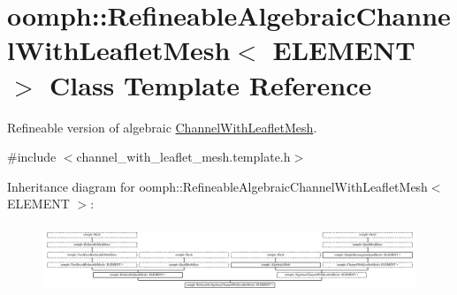 \hypertarget{classoomph_1_1RefineableAlgebraicChannelWithLeafletMesh}{}\section{oomph\+:\+:Refineable\+Algebraic\+Channel\+With\+Leaflet\+Mesh$<$ E\+L\+E\+M\+E\+NT $>$ Class Template Reference}
\label{classoomph_1_1RefineableAlgebraicChannelWithLeafletMesh}


Refineable version of algebraic \hyperlink{classoomph_1_1ChannelWithLeafletMesh}{Channel\+With\+Leaflet\+Mesh}.  




{\ttfamily \#include $<$channel\+\_\+with\+\_\+leaflet\+\_\+mesh.\+template.\+h$>$}

Inheritance diagram for oomph\+:\+:Refineable\+Algebraic\+Channel\+With\+Leaflet\+Mesh$<$ E\+L\+E\+M\+E\+NT $>$\+:\begin{figure}[H]
\begin{center}
\leavevmode
\includegraphics[height=2.100000cm]{classoomph_1_1RefineableAlgebraicChannelWithLeafletMesh}
\end{center}
\end{figure}
